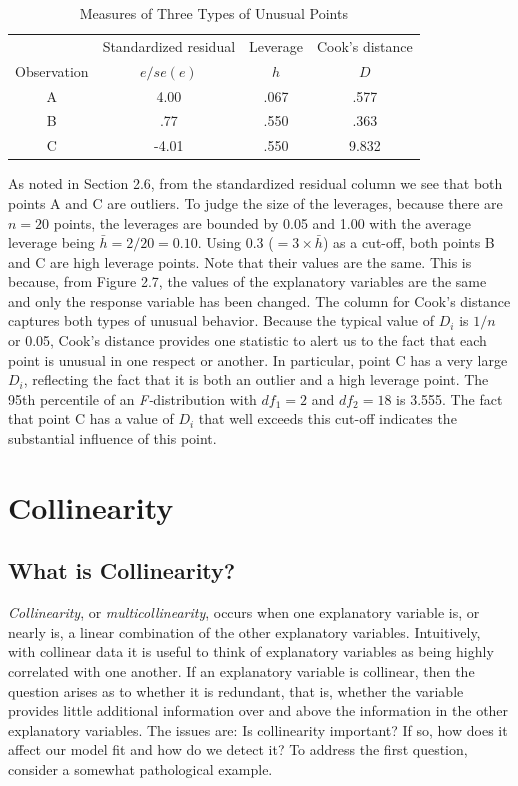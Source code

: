 \begin{table}[h]

\caption{\label{T5:Outliers} Measures of Three Types of Unusual
Points}
\begin{tabular}{cccc}
\hline
& Standardized residual & Leverage & Cook's distance \\
Observation & $e/se(e)$ & $h$ & $D$ \\ \hline
A & 4.00 & .067 & .577 \\
 B & .77 & .550 & .363 \\
C & -4.01 & .550 & 9.832 \\ \hline
\end{tabular}
\end{table}

As noted in Section 2.6, from the standardized residual column we
see that both points A and C are outliers. To judge the size of the
leverages, because there are $n=20$ points, the leverages are
bounded by 0.05 and 1.00 with the average leverage being
$\bar{h}=2/20=0.10$. Using 0.3 ($ = 3 \times  \bar{h}$) as a
cut-off, both points B and C are high leverage points. Note that
their values are the same. This is because, from Figure 2.7, the
values of the explanatory variables are the same and only the
response variable has been changed. The column for Cook's distance
captures both types of unusual behavior. Because the typical value
of $D_i$ is $1/n$ or 0.05, Cook's distance provides one statistic to
alert us to the fact that each point is unusual in one respect or
another. In particular, point C has a very large $D_i$, reflecting
the fact that it is both an outlier and a high leverage point. The
95th percentile of an \textit{F-}distribution with $df_1=2$ and
$df_2=18$ is 3.555. The fact that point C has a value of $D_i$ that
well exceeds this cut-off indicates the substantial influence of
this point.

\linejed

\section{Collinearity}

\subsection{What is Collinearity?}

\textit{Collinearity}, or \textit{multicollinearity}, occurs when
one explanatory variable is, or nearly is, a linear combination of
the other explanatory variables. Intuitively, with collinear data it
is useful to think of explanatory variables as being highly
correlated with one another. If an explanatory variable is
collinear, then the question arises as to whether it is redundant,
that is, whether the variable provides little additional information
over and above the information in the other explanatory variables.
The issues are: Is collinearity important? If so, how does it affect
our model fit and how do we detect it? To address the first
question, consider a somewhat pathological example.

